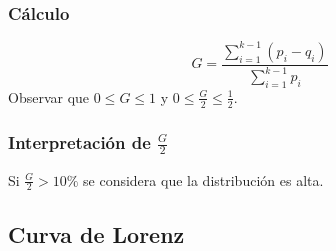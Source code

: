 \subsubsection{Cálculo}
$$G=\dfrac{\displaystyle\sum_{i=1}^{k-1}(p_i-q_i)}{\displaystyle\sum_{i=1}^{k-1}p_i}$$
Observar que $0\leq G \leq 1$ y $0\leq\frac{G}{2}\leq \frac{1}{2}$.
\subsubsection{Interpretación de $\frac{G}{2}$}
Si $\frac{G}{2}>10\%$ se considera que la distribución es alta.
\subsection{Curva de Lorenz}